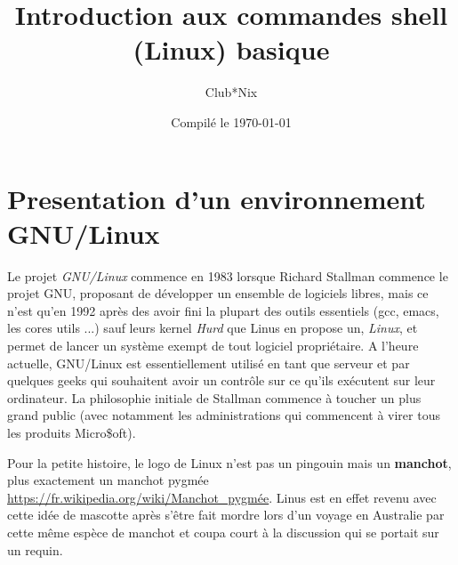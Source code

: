 \documentclass[french, a4paper, 12pt, titlepage]{article}
\begin{document}
\title{Introduction aux commandes shell (Linux) basique}
\author{Club*Nix}
\date{Compilé le \today}

\maketitle

\vfill
\pagebreak

\newpage
\strut\thispagestyle{empty}
\vfill
\pagebreak
\tableofcontents
\strut\thispagestyle{empty}
\newpage
\setcounter{page}{1}

\section{Presentation d'un environnement GNU/Linux}
Le projet \textit{GNU/Linux} commence en 1983 lorsque Richard Stallman commence le projet GNU, proposant de développer un ensemble de logiciels libres, mais ce n'est qu'en 1992 après des avoir fini la plupart des outils essentiels (gcc, emacs, les cores utils ...) sauf leurs kernel \textit{Hurd} que Linus en propose un, \textit{Linux}, et permet de lancer un système exempt de tout logiciel propriétaire.
A l'heure actuelle, GNU/Linux est essentiellement utilisé en tant que serveur et par quelques geeks qui souhaitent avoir un contrôle sur ce qu'ils exécutent sur leur ordinateur. La philosophie initiale de Stallman commence à toucher un plus grand public (avec notamment les administrations qui commencent à virer tous les produits Micro\$oft).

Pour la petite histoire, le logo de Linux n'est pas un pingouin mais un \textbf{manchot}, plus exactement un manchot pygmée \url{https://fr.wikipedia.org/wiki/Manchot_pygmée}. Linus est en effet revenu avec cette idée de mascotte après s'être fait mordre lors d'un voyage en Australie par cette même espèce de manchot et coupa court à la discussion qui se portait sur un requin.
\end{document}
